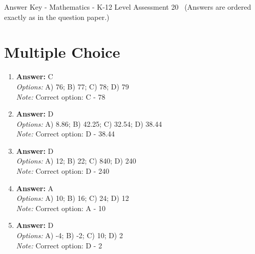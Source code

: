 \documentclass[12pt]{article}
\begin{document}
\begin{center}
Answer Key - Mathematics - K-12 Level Assessment 20 \
\small (Answers are ordered exactly as in the question paper.)
\end{center}

\section*{Multiple Choice}
\begin{enumerate}[label=\arabic*.]
\item \textbf{Answer:} C
\\ \textit{Options:} A) 76; B) 77; C) 78; D) 79
\\ \textit{Note:} Correct option: C - 78
\item \textbf{Answer:} D
\\ \textit{Options:} A) 8.86; B) 42.25; C) 32.54; D) 38.44
\\ \textit{Note:} Correct option: D - 38.44
\item \textbf{Answer:} D
\\ \textit{Options:} A) 12; B) 22; C) 840; D) 240
\\ \textit{Note:} Correct option: D - 240
\item \textbf{Answer:} A
\\ \textit{Options:} A) 10; B) 16; C) 24; D) 12
\\ \textit{Note:} Correct option: A - 10
\item \textbf{Answer:} D
\\ \textit{Options:} A) -4; B) -2; C) 10; D) 2
\\ \textit{Note:} Correct option: D - 2
\end{enumerate}
\end{document}
